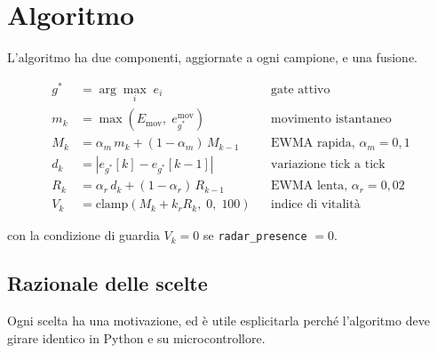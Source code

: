 \section{Algoritmo}
\label{sec:vitalita-algoritmo}

L'algoritmo ha due componenti, aggiornate a ogni campione, e una fusione.

\begin{align}
g^{*} &= \arg\max_i \; e_i && \text{gate attivo} \label{eq:gate-attivo}\\
m_k &= \max\!\left(E_{\text{mov}},\; e^{\text{mov}}_{g^{*}}\right) && \text{movimento istantaneo} \\
M_k &= \alpha_m \, m_k + (1-\alpha_m)\, M_{k-1} && \text{EWMA rapida, } \alpha_m = 0{,}1 \\
d_k &= \left| e_{g^{*}}[k] - e_{g^{*}}[k-1] \right| && \text{variazione tick a tick} \\
R_k &= \alpha_r \, d_k + (1-\alpha_r)\, R_{k-1} && \text{EWMA lenta, } \alpha_r = 0{,}02 \\
V_k &= \mathrm{clamp}\!\left(M_k + k_r R_k,\; 0,\; 100\right) && \text{indice di vitalità}
\label{eq:vitalita}
\end{align}

con la condizione di guardia $V_k = 0$ se \texttt{radar\_presence} $= 0$.

\subsection{Razionale delle scelte}

Ogni scelta ha una motivazione, ed è utile esplicitarla perché l'algoritmo deve
girare identico in Python e su microcontrollore.

